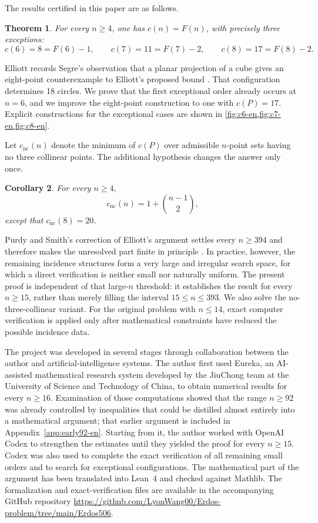 \documentclass[11pt,a4paper]{article}
\newtheorem{theorem}{Theorem}[section]
\newtheorem{corollary}[theorem]{Corollary}
\theoremstyle{definition}
\begin{document}
The results certified in this paper are as follows.

\begin{theorem}\label{thm:main-en}
For every $n\ge4$, one has $c(n)=F(n)$, with precisely three exceptions:
\[
c(6)=8=F(6)-1,\qquad c(7)=11=F(7)-2,\qquad
c(8)=17=F(8)-2.
\]
\end{theorem}

Elliott records Segre's observation that a planar projection of a cube gives an
eight-point counterexample to Elliott's proposed bound
\cite[p.~182, discussion following Theorem~2]{elliott-en}.  That configuration
determines 18 circles.  We prove that the first exceptional order already occurs
at $n=6$, and we improve the eight-point construction to one with $c(P)=17$.
Explicit constructions for the exceptional cases are shown in
\cref{fig:c6-en,fig:c7-en,fig:c8-en}.

Let $c_{\mathrm{nc}}(n)$ denote the minimum of $c(P)$ over admissible
$n$-point sets having no three collinear points.  The additional hypothesis
changes the answer only once.

\begin{corollary}\label{thm:no-three-en}
For every $n\ge4$,
\[
 c_{\mathrm{nc}}(n)=1+\binom{n-1}{2},
\]
except that $c_{\mathrm{nc}}(8)=20$.
\end{corollary}

Purdy and Smith's correction of Elliott's argument settles every $n\ge394$ and
therefore makes the unresolved part finite in principle
\cite[\S2.1]{purdy-smith-en}.  In practice, however, the remaining incidence
structures form a very large and irregular search space, for which a direct
verification is neither small nor naturally uniform.  The present proof is
independent of that large-$n$ threshold: it establishes the result for every
$n\ge15$, rather than merely filling the interval $15\le n\le393$.  We also solve
the no-three-collinear variant.  For the original problem with $n\le14$, exact
computer verification is applied only after mathematical constraints have reduced
the possible incidence data.

The project was developed in several stages through collaboration between the
author and artificial-intelligence systems.  The author first used Eureka, an
AI-assisted mathematical research system developed by the JiuChong team at the
University of Science and Technology of China, to obtain numerical results for
every $n\ge16$.  Examination of those computations showed that the range
$n\ge92$ was already controlled by inequalities that could be distilled almost
entirely into a mathematical argument; that earlier argument is included in
Appendix~\ref{app:early92-en}.  Starting from it, the author worked with OpenAI
Codex to strengthen the estimates until they yielded the proof for every
$n\ge15$.  Codex was also used to complete the exact verification of all
remaining small orders and to search for exceptional configurations.  The
mathematical part of the argument has been translated into Lean~4 and checked
against Mathlib.  The formalization and exact-verification files are available
in the accompanying GitHub repository
\url{https://github.com/LyonWang00/Erdos-problem/tree/main/Erdos506}.
\end{document}
